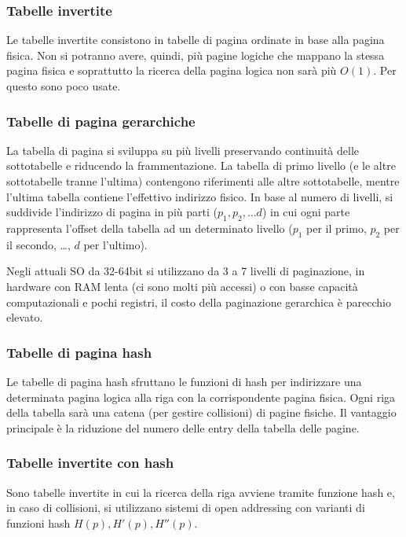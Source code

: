 \documentclass[a4paper]{article}
\begin{document}
\subsubsection*{Tabelle invertite}
Le tabelle invertite consistono in tabelle di pagina ordinate in base alla pagina fisica. Non si potranno avere, quindi, più pagine
logiche che mappano la stessa pagina fisica e soprattutto la ricerca della pagina logica non sarà più \(O(1)\). Per questo sono
poco usate.

\subsubsection*{Tabelle di pagina gerarchiche}
La tabella di pagina si sviluppa su più livelli preservando continuità delle sottotabelle e riducendo la frammentazione. La
tabella di primo livello (e le altre sottotabelle tranne l'ultima) contengono riferimenti alle altre sottotabelle, mentre
l'ultima tabella contiene l'effettivo indirizzo fisico. In base al numero di livelli, si suddivide l'indirizzo di pagina in
più parti (\(p_1, p_2, \dots d\)) in cui ogni parte rappresenta l'offset della tabella ad un determinato livello (\(p_1\) per
il primo, \(p_2\) per il secondo, \dots, \(d\) per l'ultimo).

Negli attuali SO da 32-64bit si utilizzano da 3 a 7 livelli di paginazione, in hardware con RAM lenta (ci sono molti più accessi)
o con basse capacità computazionali e pochi registri, il costo della paginazione gerarchica è parecchio elevato.

\subsubsection*{Tabelle di pagina hash}
Le tabelle di pagina hash sfruttano le funzioni di hash per indirizzare una determinata pagina logica alla riga con la
corrispondente pagina fisica. Ogni riga della tabella sarà una catena (per gestire collisioni) di pagine fisiche. Il vantaggio
principale è la riduzione del numero delle entry della tabella delle pagine.

\subsubsection*{Tabelle invertite con hash}
Sono tabelle invertite in cui la ricerca della riga avviene tramite funzione hash e, in caso di collisioni, si utilizzano sistemi
di open addressing con varianti di funzioni hash \(H(p), H'(p), H''(p)\).
\end{document}
